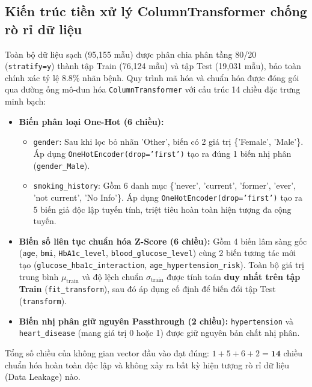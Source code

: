 \documentclass[12pt,a4paper]{report}
\begin{document}
\subsection{Kiến trúc tiền xử lý ColumnTransformer chống rò rỉ dữ liệu}
Toàn bộ dữ liệu sạch (95,155 mẫu) được phân chia phân tầng 80/20 (\texttt{stratify=y}) thành tập Train (76,124 mẫu) và tập Test (19,031 mẫu), bảo toàn chính xác tỷ lệ 8.8\% nhãn bệnh. Quy trình mã hóa và chuẩn hóa được đóng gói qua đường ống mô-đun hóa \texttt{ColumnTransformer} với cấu trúc 14 chiều đặc trưng minh bạch:
\begin{itemize}
    \item \textbf{Biến phân loại One-Hot (6 chiều):} 
    \begin{itemize}
        \item \texttt{gender}: Sau khi lọc bỏ nhãn 'Other', biến có 2 giá trị \{'Female', 'Male'\}. Áp dụng \texttt{OneHotEncoder(drop='first')} tạo ra đúng 1 biến nhị phân (\texttt{gender\_Male}).
        \item \texttt{smoking\_history}: Gồm 6 danh mục \{'never', 'current', 'former', 'ever', 'not current', 'No Info'\}. Áp dụng \texttt{OneHotEncoder(drop='first')} tạo ra 5 biến giả độc lập tuyến tính, triệt tiêu hoàn toàn hiện tượng đa cộng tuyến.
    \end{itemize}
    \item \textbf{Biến số liên tục chuẩn hóa Z-Score (6 chiều):} Gồm 4 biến lâm sàng gốc (\texttt{age}, \texttt{bmi}, \texttt{HbA1c\_level}, \texttt{blood\_glucose\_level}) cùng 2 biến tương tác mới tạo (\texttt{glucose\_hba1c}\allowbreak\texttt{\_interaction}, \texttt{age\_hypertension\_risk}). Toàn bộ giá trị trung bình $\mu_{\text{train}}$ và độ lệch chuẩn $\sigma_{\text{train}}$ được tính toán \textbf{duy nhất trên tập Train} (\texttt{fit\_transform}), sau đó áp dụng cố định để biến đổi tập Test (\texttt{transform}).
    \item \textbf{Biến nhị phân giữ nguyên Passthrough (2 chiều):} \texttt{hypertension} và \texttt{heart\_disease} (mang giá trị 0 hoặc 1) được giữ nguyên bản chất nhị phân.
\end{itemize}
Tổng số chiều của không gian vector đầu vào đạt đúng: $1 + 5 + 6 + 2 = \mathbf{14}$ chiều chuẩn hóa hoàn toàn độc lập và không xảy ra bất kỳ hiện tượng rò rỉ dữ liệu (Data Leakage) nào.
\end{document}
